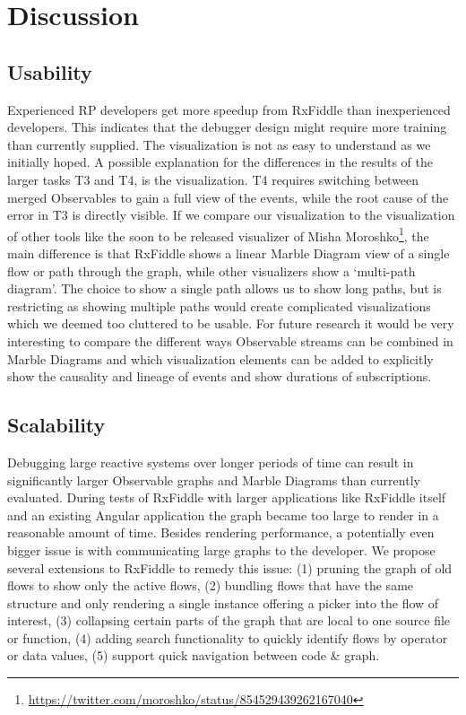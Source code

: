 \section{Discussion}
\subsection{Usability}
Experienced RP developers get more speedup from RxFiddle than inexperienced developers. This indicates that the debugger design might require more training than currently supplied. The visualization is not as easy to understand as we initially hoped. A possible explanation for the differences in the results of the larger tasks T3 and T4, is the visualization. T4 requires switching between merged Observables to gain a full view of the events, while the root cause of the error in T3 is directly visible. If we compare our visualization to the visualization of other tools like the soon to be released visualizer of Misha Moroshko\footnote{\url{https://twitter.com/moroshko/status/854529439262167040}}, the main difference is that RxFiddle shows a linear Marble Diagram view of a single flow or path through the graph, while other visualizers show a `multi-path diagram'. The choice to show a single path allows us to show long paths, but is restricting as showing multiple paths would create complicated visualizations which we deemed too cluttered to be usable. For future research it would be very interesting to compare the different ways Observable streams can be combined in Marble Diagrams and which visualization elements can be added to explicitly show the causality and lineage of events and show durations of subscriptions.

\subsection{Scalability}
Debugging large reactive systems over longer periods of time can result in significantly larger Observable graphs and Marble Diagrams than currently evaluated. During tests of RxFiddle with larger applications like RxFiddle itself and an existing Angular application the graph became too large to render in a reasonable amount of time. Besides rendering performance, a potentially even bigger issue is with communicating large graphs to the developer. We propose several extensions to RxFiddle to remedy this issue: (1) pruning the graph of old flows to show only the active flows, (2) bundling flows that have the same structure and only rendering a single instance offering a picker into the flow of interest, (3) collapsing certain parts of the graph that are local to one source file or function, (4) adding search functionality to quickly identify flows by operator or data values, (5) support quick navigation between code \& graph.

